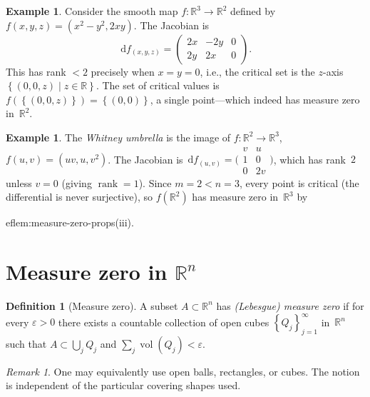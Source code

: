 \documentclass[12pt,a4paper,openany]{book}
\theoremstyle{definition}
\newtheorem{definition}[theorem]{Definition}
\newtheorem{example}[theorem]{Example}
\theoremstyle{remark}
\newtheorem{remark}[theorem]{Remark}
\newcommand{\R}{\mathbb{R}}
\newcommand{\dd}{\,\mathrm{d}}
\newcommand{\set}[1]{\left\{ #1 \right\}}
\begin{document}
\begin{example}\label{ex:critical-projection}
Consider the smooth map $f\colon\R^3\to\R^2$ defined by
$f(x,y,z) = (x^2-y^2, 2xy)$.  The Jacobian is
\[
  \dd f_{(x,y,z)} = \begin{pmatrix} 2x & -2y & 0 \\ 2y & 2x & 0 \end{pmatrix}.
\]
This has rank $<2$ precisely when $x = y = 0$, i.e., the critical set
is the $z$-axis $\set{(0,0,z)\mid z\in\R}$.  The set of critical
values is $f(\set{(0,0,z)}) = \set{(0,0)}$, a single point---which
indeed has measure zero in~$\R^2$.
\end{example}

\begin{example}\label{ex:whitney-umbrella}
The \emph{Whitney umbrella} is the image of $f\colon\R^2\to\R^3$,
$f(u,v) = (uv, u, v^2)$.  The Jacobian is
$\dd f_{(u,v)} = \bigl(\begin{smallmatrix} v & u \\ 1 & 0 \\
0 & 2v\end{smallmatrix}\bigr)$,
which has rank~$2$ unless $v = 0$ (giving $\operatorname{rank}= 1$).
Since $m = 2 < n = 3$, every point is critical (the differential is
never surjective), so $f(\R^2)$ has measure zero in~$\R^3$ by

ef{lem:measure-zero-props}(iii).
\end{example}

\section{Measure zero in $\R^n$}\label{sec:measure-zero}

\begin{definition}[Measure zero]\label{def:measure-zero}
A subset $A\subset\R^n$ has \emph{(Lebesgue) measure zero} if for
every $\varepsilon > 0$ there exists a countable collection of
open cubes $\set{Q_j}_{j=1}^\infty$ in~$\R^n$ such that
$A\subset\bigcup_j Q_j$ and $\sum_j \operatorname{vol}(Q_j) < \varepsilon$.
\end{definition}

\begin{remark}\label{rem:measure-zero-equiv}
One may equivalently use open balls, rectangles, or cubes.  The notion
is independent of the particular covering shapes used.
\end{remark}
\end{document}
